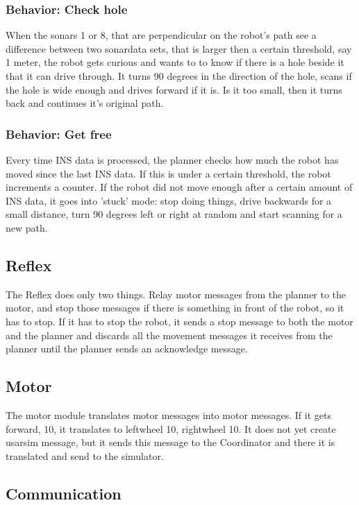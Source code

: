 \documentclass[titlepage, a4paper,10pt]{article}
\begin{document}
\subsubsection{Behavior: Check hole}
When the sonars 1 or 8, that are perpendicular on the robot's path see a difference between two sonardata sets, that is larger then a certain threshold, say 1 meter, the robot gets curious and wants to to know if there is a hole beside it that it can drive through. It turns 90 degrees in the direction of the hole, scans if the hole is wide enough and drives forward if it is. Is it too small, then it turns back and continues it's original path.

\subsubsection{Behavior: Get free}
Every time INS data is processed, the planner checks how much the robot has moved since the last INS data. If this is under a certain threshold, the robot increments a counter. If the robot did not move enough after a certain amount of INS data, it goes into 'stuck' mode: stop doing things, drive backwards for a small distance, turn 90 degrees left or right at random and start scanning for a new path.

\subsection{Reflex}
The Reflex does only two things. Relay motor messages from the planner to the motor, and stop those messages if there is something in front of the robot, so it has to stop. If it has to stop the robot, it sends a stop message to both the motor and the planner and discards all the movement messages it receives from the planner until the planner sends an acknowledge message.

\subsection{Motor}
The motor module translates motor messages into motor messages. If it gets forward, 10, it translates to leftwheel 10, rightwheel 10. It does not yet create usarsim message, but it sends this message to the Coordinator and there it is translated and send to the simulator.

\subsection{Communication}

\end{document}
